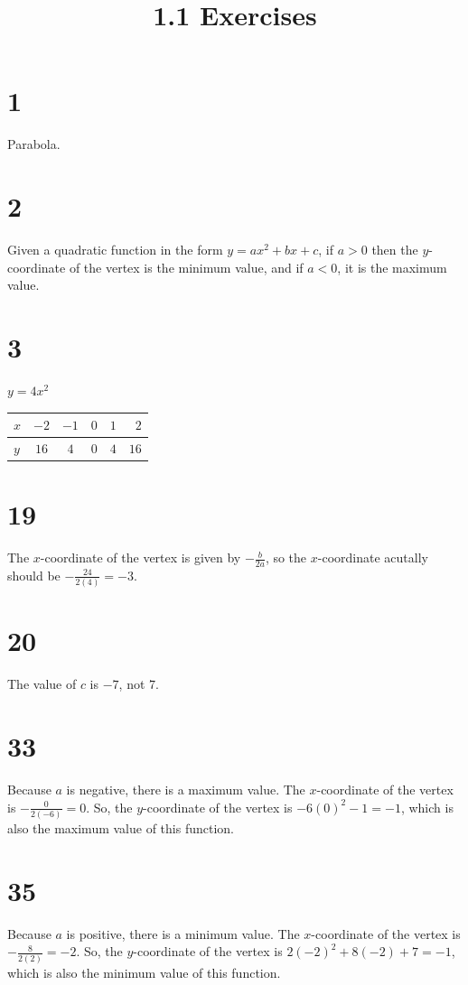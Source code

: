 \documentclass{article}
\title{1.1 Exercises}
\theoremstyle{definition}
\begin{document}
\maketitle

\section*{1}
Parabola.

\section*{2}
Given a quadratic function in the form $y=ax^2+bx+c$, if $a>0$ then the $y$-coordinate of the vertex is the minimum value, and if $a<0$, it is the maximum value.

\section*{3}
$y=4x^2$\newline
\begin{table}[h!]
	\begin{center}
		\begin{tabular}{l|c|c|c|c|r}
			$x$ & $-2$ & $-1$ & $0$ & $1$ & $2$ \\
			\hline
			$y$ & $16$ & $4$ & $0$ & $4$ & $16$
		\end{tabular}
	\end{center}
\end{table}
	    

\section*{19}
The $x$-coordinate of the vertex is given by $-\frac{b}{2a}$, so the $x$-coordinate acutally should be $-\frac{24}{2(4)}=-3$.

\section*{20}
The value of $c$ is $-7$, not $7$.

\section*{33}
Because $a$ is negative, there is a maximum value. The $x$-coordinate of the vertex is $-\frac{0}{2(-6)}=0$. So, the $y$-coordinate of the vertex is $-6(0)^2-1=-1$, which is 
also the maximum value of this function.

\section*{35}
Because $a$ is positive, there is a minimum value. The $x$-coordinate of the vertex is $-\frac{8}{2(2)}=-2$. So, the $y$-coordinate of the vertex is $2(-2)^2+8(-2)+7=-1$, 
which is also the minimum value of this function.
\end{document}
